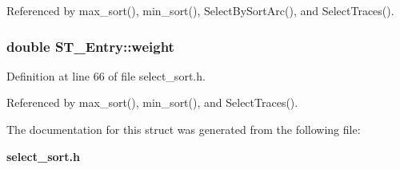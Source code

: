 Referenced by max\_\-sort(), min\_\-sort(), Select\-By\-Sort\-Arc(), and Select\-Traces().
\subsubsection{\setlength{\rightskip}{0pt plus 5cm}double \bf{ST\_\-Entry::weight}}\label{structST__Entry_7c953ccf0c5920dd0f34b0747351bdf0}




Definition at line 66 of file select\_\-sort.h.

Referenced by max\_\-sort(), min\_\-sort(), and Select\-Traces().

The documentation for this struct was generated from the following file:\begin{CompactItemize}
\item 
\bf{select\_\-sort.h}\end{CompactItemize}
